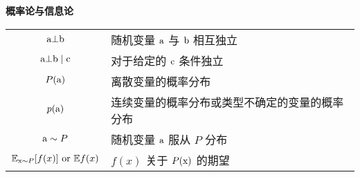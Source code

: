 \vspace{\notationgap}
\begin{minipage}{\textwidth}
\centerline{\bf 概率论与信息论}
\bgroup
\def\arraystretch{1.5}
\begin{tabular}{cp{3.25in}}
$\displaystyle {\textnormal{a}} \bot {\textnormal{b}}$ & 随机变量 ${\textnormal{a}}$ 与 ${\textnormal{b}}$ 相互独立\\
$\displaystyle {\textnormal{a}} \bot {\textnormal{b}} \mid {\textnormal{c}} $ & 对于给定的 ${\textnormal{c}}$ 条件独立\\
$\displaystyle P({\textnormal{a}})$ & 离散变量的概率分布\\
$\displaystyle p({\textnormal{a}})$ & 连续变量的概率分布或类型不确定的变量的概率分布 \\
$\displaystyle {\textnormal{a}} \sim P$ & 随机变量 ${\textnormal{a}}$ 服从 $P$ 分布\\%
$\displaystyle  \mathbb{E}_{{\textnormal{x}}\sim P} [ f(x) ]\text{ or } \mathbb{E} f(x)$ & $f(x)$ 关于 $P({\textnormal{x}})$ 的期望\\

\end{tabular}
\end{minipage}
